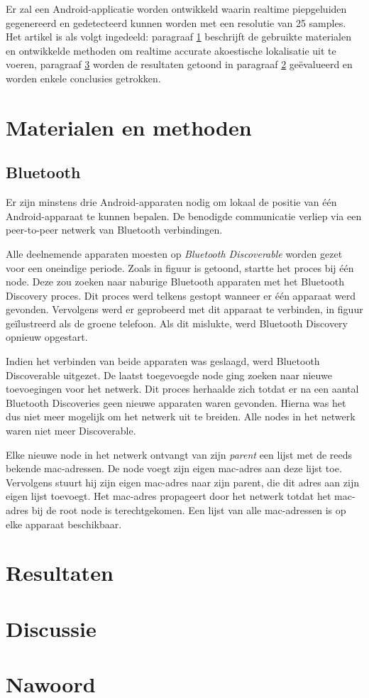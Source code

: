 \documentclass[12pt]{article}
\begin{document}
Er zal een Android-applicatie worden ontwikkeld waarin realtime piepgeluiden gegenereerd en gedetecteerd kunnen worden met een resolutie van 25 samples. Het artikel is als volgt ingedeeld: paragraaf \ref{sec:materialen} beschrijft de gebruikte materialen en ontwikkelde methoden om realtime accurate akoestische lokalisatie uit te voeren, paragraaf \ref{sec:discussie} worden de resultaten getoond in paragraaf \ref{sec:resultaten} ge\"evalueerd en worden enkele conclusies getrokken.

\section{Materialen en methoden}
\label{sec:materialen}

\subsection{Bluetooth}
Er zijn minstens drie Android-apparaten nodig om lokaal de positie van \'e\'en Android-apparaat te kunnen bepalen. De benodigde communicatie verliep via een peer-to-peer \cite{schollmeier2001definition} netwerk van Bluetooth \cite{haartsen2000bluetooth} verbindingen.

Alle deelnemende apparaten moesten op \textit{Bluetooth Discoverable} worden gezet voor een oneindige periode. Zoals in figuur is getoond, startte het proces bij \'e\'en node. Deze zou zoeken naar naburige Bluetooth apparaten met het Bluetooth Discovery proces. Dit proces werd telkens gestopt wanneer er \'e\'en apparaat werd gevonden. Vervolgens werd er geprobeerd met dit apparaat te verbinden, in figuur ge\"ilustreerd als de groene telefoon. Als dit mislukte, werd Bluetooth Discovery opnieuw opgestart.

Indien het verbinden van beide apparaten was geslaagd, werd Bluetooth Discoverable uitgezet. De laatst toegevoegde node ging zoeken naar nieuwe toevoegingen voor het netwerk. Dit proces herhaalde zich totdat er na een aantal Bluetooth Discoveries geen nieuwe apparaten waren gevonden. Hierna was het dus niet meer mogelijk om het netwerk uit te breiden. Alle nodes in het netwerk waren niet meer Discoverable.

Elke nieuwe node in het netwerk ontvangt van zijn \textit{parent} een lijst met de reeds bekende mac-adressen. De node voegt zijn eigen mac-adres aan deze lijst toe. Vervolgens stuurt hij zijn eigen mac-adres naar zijn parent, die dit adres aan zijn eigen lijst toevoegt. Het mac-adres propageert door het netwerk totdat het mac-adres bij de root node is terechtgekomen. Een lijst van alle mac-adressen is op elke apparaat beschikbaar. 

\section{Resultaten}
\label{sec:resultaten}

\section{Discussie}
\label{sec:discussie}

\section{Nawoord}
\label{sec:nawoord}



\end{document}
